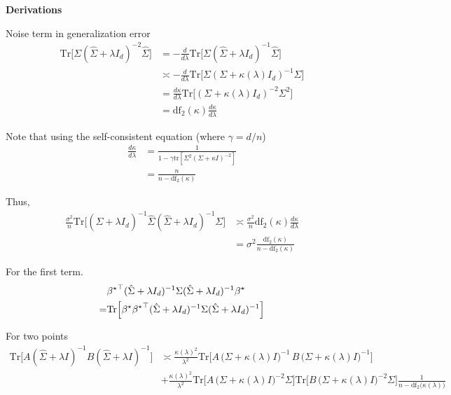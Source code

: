 \noindent\begin{minipage}[t]{1\columnwidth}%
\textbf{Derivations}

Noise term in generalization error
\begin{align*}
\mathrm{Tr}\Big[\Sigma(\hat{\Sigma}+\lambda I_{d})^{-2}\hat{\Sigma}\Big] & =-\frac{d}{d\lambda}\mathrm{Tr}\Big[\Sigma(\hat{\Sigma}+\lambda I_{d})^{-1}\hat{\Sigma}\Big]\\
 & \asymp-\frac{d}{d\lambda}\mathrm{Tr}\Big[\Sigma(\Sigma+\kappa(\lambda)I_{d})^{-1}\Sigma\Big]\\
 & =\frac{d\kappa}{d\lambda}\mathrm{Tr}\Big[(\Sigma+\kappa(\lambda)I_{d})^{-2}\Sigma^{2}\Big]\\
 & =\mathrm{df}_{2}(\kappa)\frac{d\kappa}{d\lambda}
\end{align*}

Note that using the self-consistent equation (where $\ensuremath{\gamma=d/n}$)
\begin{align*}
\frac{d\kappa}{d\lambda} & =\frac{1}{1-\gamma\mathrm{tr}[\Sigma^{2}(\Sigma+\kappa I)^{-2}]}\\
 & =\frac{n}{n-\mathrm{df}_{2}(\kappa)}
\end{align*}

Thus,
\begin{align*}
\frac{\sigma^{2}}{n}\mathrm{Tr}\Big[(\hat{\Sigma}+\lambda I_{d})^{-1}\hat{\Sigma}(\hat{\Sigma}+\lambda I_{d})^{-1}\Sigma\Big] & \asymp\frac{\sigma^{2}}{n}\mathrm{df}_{2}(\kappa)\frac{d\kappa}{d\lambda}\\
 & =\sigma^{2}\frac{\mathrm{df}_{2}(\kappa)}{n-\mathrm{df}_{2}(\kappa)}
\end{align*}

For the first term.
\begin{align*}
 & {{\beta^{\star}}}^{\top}(\hat{\Sigma}+\lambda I_{d})^{-1}\Sigma(\hat{\Sigma}+\lambda I_{d})^{-1}{\beta^{\star}}\\
= & \mathrm{Tr}\Big[{\beta^{\star}}{{\beta^{\star}}}^{\top}(\hat{\Sigma}+\lambda I_{d})^{-1}\Sigma(\hat{\Sigma}+\lambda I_{d})^{-1}\Big]
\end{align*}

For two points
\begin{align*}
\mbox{Tr}\bigl[A(\widehat{\Sigma}+\lambda I)^{-1}B(\widehat{\Sigma}+\lambda I)^{-1}\bigr] & \asymp\frac{\kappa(\lambda)^{2}}{\lambda^{2}\,}\mbox{Tr}\bigl[A\,\bigl(\Sigma+\kappa(\lambda)I\bigr)^{-1}\,B\,\bigl(\Sigma+\kappa(\lambda)I\bigr)^{-1}\bigr]\\
 & +\frac{\kappa(\lambda)^{2}}{\lambda^{2}}\mbox{Tr}\bigl[A\,\bigl(\Sigma+\kappa(\lambda)I\bigr)^{-2}\Sigma\bigr]\mbox{Tr}\bigl[B\,\bigl(\Sigma+\kappa(\lambda)I\bigr)^{-2}\Sigma\bigr]\frac{1}{n-\mathrm{df}_{2}\bigl(\kappa(\lambda)\bigr)}
\end{align*}


\end{minipage}
